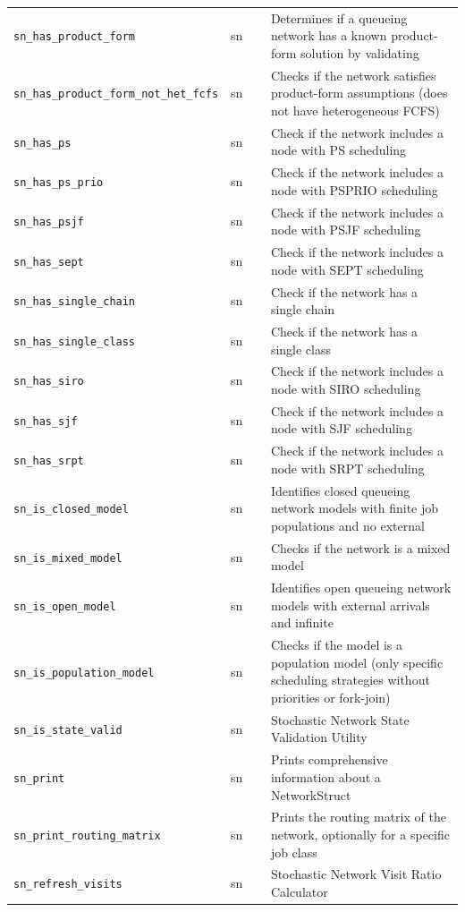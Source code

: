 \begin{footnotesize}
\begin{longtable}{|p{0.4\linewidth}|p{0.1\linewidth}|p{0.5\linewidth}|}
\texttt{sn\_has\_product\_form} & sn & Determines if a queueing network has a known product-form solution by validating\\
\texttt{sn\_has\_product\_form\_not\_het\_fcfs} & sn & Checks if the network satisfies product-form assumptions (does not have heterogeneous FCFS)\\
\texttt{sn\_has\_ps} & sn & Check if the network includes a node with PS scheduling\\
\texttt{sn\_has\_ps\_prio} & sn & Check if the network includes a node with PSPRIO scheduling\\
\texttt{sn\_has\_psjf} & sn & Check if the network includes a node with PSJF scheduling\\
\texttt{sn\_has\_sept} & sn & Check if the network includes a node with SEPT scheduling\\
\texttt{sn\_has\_single\_chain} & sn & Check if the network has a single chain\\
\texttt{sn\_has\_single\_class} & sn & Check if the network has a single class\\
\texttt{sn\_has\_siro} & sn & Check if the network includes a node with SIRO scheduling\\
\texttt{sn\_has\_sjf} & sn & Check if the network includes a node with SJF scheduling\\
\texttt{sn\_has\_srpt} & sn & Check if the network includes a node with SRPT scheduling\\
\texttt{sn\_is\_closed\_model} & sn & Identifies closed queueing network models with finite job populations and no external\\
\texttt{sn\_is\_mixed\_model} & sn & Checks if the network is a mixed model\\
\texttt{sn\_is\_open\_model} & sn & Identifies open queueing network models with external arrivals and infinite\\
\texttt{sn\_is\_population\_model} & sn & Checks if the model is a population model (only specific scheduling strategies without priorities or fork-join)\\
\texttt{sn\_is\_state\_valid} & sn & Stochastic Network State Validation Utility\\
\texttt{sn\_print} & sn & Prints comprehensive information about a NetworkStruct\\
\texttt{sn\_print\_routing\_matrix} & sn & Prints the routing matrix of the network, optionally for a specific job class\\
\texttt{sn\_refresh\_visits} & sn & Stochastic Network Visit Ratio Calculator\\

\end{longtable}
\end{footnotesize}
